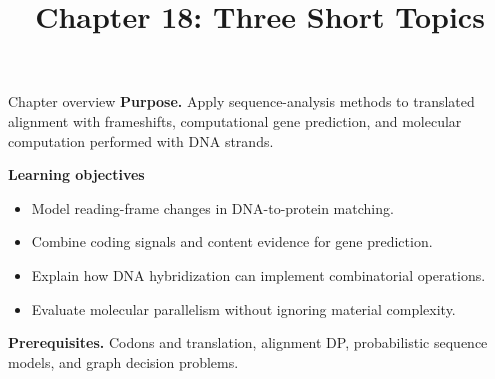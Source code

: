 \documentclass[11pt,letterpaper]{article}
\title{Chapter 18: Three Short Topics}
\author{}
\date{}
\begin{document}
\maketitle

\begin{CornellOverviewBox}{Chapter overview}
\textbf{Purpose.} Apply sequence-analysis methods to translated alignment with frameshifts, computational gene prediction, and molecular computation performed with DNA strands.

\textbf{Learning objectives}
\begin{itemize}
  \item Model reading-frame changes in DNA-to-protein matching.
  \item Combine coding signals and content evidence for gene prediction.
  \item Explain how DNA hybridization can implement combinatorial operations.
  \item Evaluate molecular parallelism without ignoring material complexity.
\end{itemize}

\textbf{Prerequisites.} Codons and translation, alignment DP, probabilistic sequence models, and graph decision problems.
\end{CornellOverviewBox}
\end{document}
